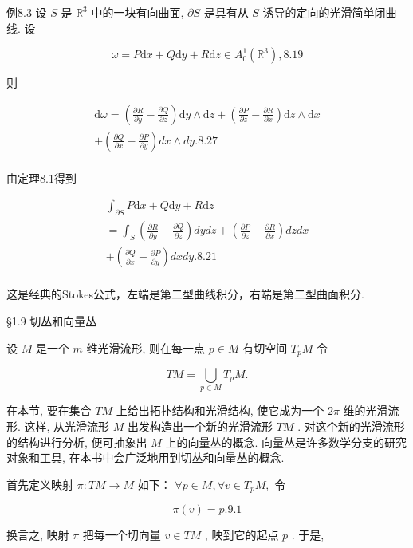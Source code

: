 例8.3 设  $S$  是  $\mathbb{R}^3$  中的一块有向曲面,  $\partial S$  是具有从  $S$  诱导的定向的光滑简单闭曲线. 设

$$
\omega = P \mathrm {d} x + Q \mathrm {d} y + R \mathrm {d} z \in A _ {0} ^ {1} \left(\mathbb {R} ^ {3}\right),  {8.19}
$$

则

$$
\begin{array}{l} \mathrm {d} \omega = \left(\frac {\partial R}{\partial y} - \frac {\partial Q}{\partial z}\right) \mathrm {d} y \wedge \mathrm {d} z + \left(\frac {\partial P}{\partial z} - \frac {\partial R}{\partial x}\right) \mathrm {d} z \wedge \mathrm {d} x \\ + \left(\frac {\partial Q}{\partial x} - \frac {\partial P}{\partial y}\right) d x \wedge d y.  {8.27} \\ \end{array}
$$

由定理8.1得到

$$
\begin{array}{l} \int_ {\partial S} P \mathrm {d} x + Q \mathrm {d} y + R \mathrm {d} z \\ = \int_ {S} \left(\frac {\partial R}{\partial y} - \frac {\partial Q}{\partial z}\right) d y d z + \left(\frac {\partial P}{\partial z} - \frac {\partial R}{\partial x}\right) d z d x \\ + \left(\frac {\partial Q}{\partial x} - \frac {\partial P}{\partial y}\right) d x d y.  {8.21} \\ \end{array}
$$

这是经典的Stokes公式，左端是第二型曲线积分，右端是第二型曲面积分.

 §1.9 切丛和向量丛

设  $M$  是一个  $m$  维光滑流形, 则在每一点  $p \in M$  有切空间  $T_{p}M$  令

$$
T M = \bigcup_ {p \in M} T _ {p} M.
$$

在本节, 要在集合  $T M$  上给出拓扑结构和光滑结构, 使它成为一个  $2 \pi$  维的光滑流形. 这样, 从光滑流形  $M$  出发构造出一个新的光滑流形  $T M$ . 对这个新的光滑流形的结构进行分析, 便可抽象出  $M$  上的向量丛的概念. 向量丛是许多数学分支的研究对象和工具, 在本书中会广泛地用到切丛和向量丛的概念.

首先定义映射  $\pi :TM\to M$  如下：  $\forall p\in M,\forall v\in T_pM,$  令

$$
\pi (v) = p.  {9.1}
$$

换言之, 映射  $\pi$  把每一个切向量  $v \in TM$ , 映到它的起点  $p$ . 于是,

